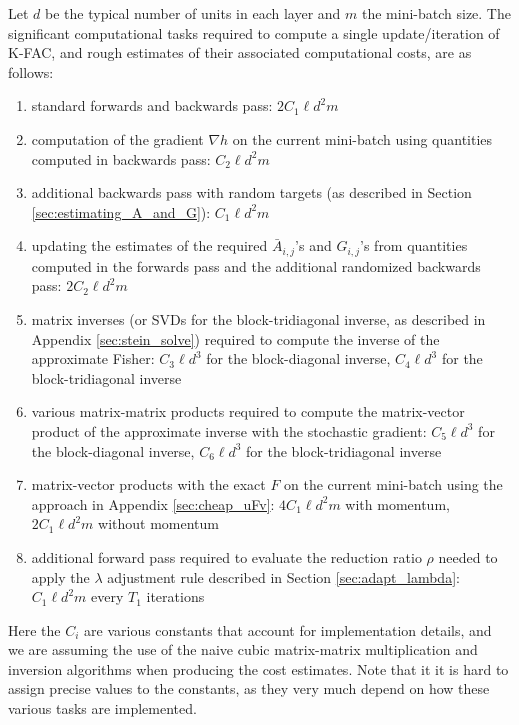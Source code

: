 \documentclass[12pt]{article}
\newcommand{\acronym}{K-FAC}
\begin{document}
Let $d$ be the typical number of units in each layer and $m$ the mini-batch size. The significant computational tasks required to compute a single update/iteration of \acronym{}, and rough estimates of their associated computational costs, are as follows:
\begin{enumerate}
\item standard forwards and backwards pass: $2C_1 \ell d^2 m$ \label{task:standard_fb}
\item computation of the gradient $\nabla h$ on the current mini-batch using quantities computed in backwards pass: $C_2 \ell d^2 m$ \label{task:gradient}
\item additional backwards pass with random targets (as described in Section \ref{sec:estimating_A_and_G}): $C_1 \ell d^2 m$ \label{task:extra_backwards}
\item updating the estimates of the required $\bar{A}_{i,j}$'s and $G_{i,j}$'s from quantities computed in the forwards pass and the additional randomized backwards pass:  $2C_2 \ell d^2 m$ \label{task:A_G_est}
\item matrix inverses (or SVDs for the block-tridiagonal inverse, as described in Appendix \ref{sec:stein_solve}) required to compute the inverse of the approximate Fisher: $C_3 \ell d^3$ for the block-diagonal inverse, $C_4 \ell d^3$ for the block-tridiagonal inverse \label{task:inverses_and_svds}
\item various matrix-matrix products required to compute the matrix-vector product of the approximate inverse with the stochastic gradient: $C_5 \ell d^3$ for the block-diagonal inverse, $C_6 \ell d^3$ for the block-tridiagonal inverse \label{task:approxF_product}
\item matrix-vector products with the exact $F$ on the current mini-batch using the approach in Appendix \ref{sec:cheap_uFv}: $4C_1 \ell d^2 m$ with momentum, $2C_1 \ell d^2 m$ without momentum \label{task:exactF_product}
\item additional forward pass required to evaluate the reduction ratio $\rho$ needed to apply the $\lambda$ adjustment rule described in Section \ref{sec:adapt_lambda}: $C_1 \ell d^2 m$ every $T_1$ iterations \label{task:rho_comp}
\end{enumerate}
Here the $C_i$ are various constants that account for implementation details, and we are assuming the use of the naive cubic matrix-matrix multiplication and inversion algorithms when producing the cost estimates.  Note that it it is hard to assign precise values to the constants, as they very much depend on how these various tasks are implemented.
\end{document}
